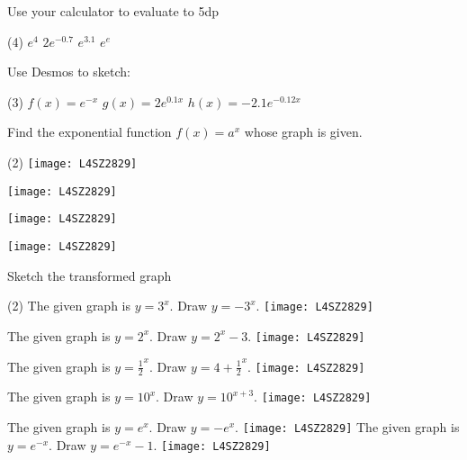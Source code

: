 \begin{Exercise}[title={$e^x$ functions},label=exExpFunctions]
	\Question Use your calculator to evaluate to 5dp 
	\begin{tasks}(4)
	\task $e^{4}$ %
\task $2 e^{ -0.7}$ %
\task $e^{3.1}$ %
\task $e^{e}$ %
	\end{tasks}

\Question Use Desmos to sketch: 
\begin{tasks}(3)
\task $f (x) =e^{ -x}$ 
\task $g (x) =2 e^{0.1 x}$ 
\task $h (x) = -2.1 e^{ -0.12 x}$
\end{tasks}

	\Question Find the exponential function $f (x) =a^{x}$ whose graph is given. 
\begin{tasks}(2)
	\task \texttt{[image: L4SZ2829]}
	
	\task \texttt{[image: L4SZ2829]}
	
	\task \texttt{[image: L4SZ2829]}
	
	\task \texttt{[image: L4SZ2829]}
\end{tasks}

\Question Sketch the transformed graph
\begin{tasks}(2)
	\task The given graph is $y =3^x$. Draw $y = -3^{x}$. %
	\texttt{[image: L4SZ2829]}
	
	\task The given graph is $y =2^x$. Draw $y =2^{x} -3$.%
	\texttt{[image: L4SZ2829]}
	
	\task The given graph is $y =\frac{1}{2}^{x}$. Draw $y =4 +\frac{1}{2}^{x}$.%
	\texttt{[image: L4SZ2829]}
	
	\task The given graph is $y =10^{x}$. Draw $y =10^{x +3}$.%
	\texttt{[image: L4SZ2829]}
	
	\task The given graph is $y =e^{x}$. Draw $y = -e^{x}$. %
	\texttt{[image: L4SZ2829]}
	\task The given graph is $y =e^{ -x}$. Draw $y =e^{ -x} -1$.%
 \texttt{[image: L4SZ2829]}
\end{tasks}
\end{Exercise}
